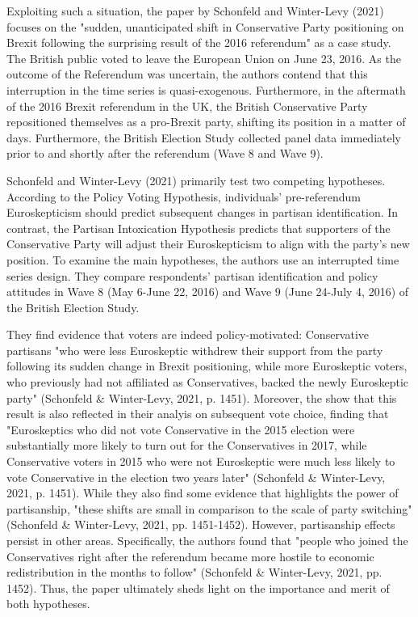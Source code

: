 \documentclass[12pt,letterpaper]{article}
\begin{document}
	Exploiting such a situation, the paper by Schonfeld and Winter-Levy (2021) focuses on the "sudden, unanticipated shift in Conservative Party positioning on Brexit following the surprising result of the 2016 referendum" as a case study. The British public voted to leave the European Union on June 23, 2016. As the outcome of the Referendum was uncertain, the authors contend that this interruption in the time series is quasi-exogenous. Furthermore, in the aftermath of the 2016 Brexit referendum in the UK, the British Conservative Party repositioned themselves as a pro-Brexit party, shifting its position in a matter of days. Furthermore, the British Election Study collected panel data immediately prior to and shortly after the referendum (Wave 8 and Wave 9).  
	
	Schonfeld and Winter-Levy (2021) primarily test two competing hypotheses. According to the Policy Voting Hypothesis, individuals’ pre-referendum Euroskepticism should predict subsequent changes in partisan identification. In contrast, the Partisan Intoxication Hypothesis predicts that supporters of the Conservative Party will adjust their Euroskepticism to align with the party’s new position. To examine the main hypotheses, the authors use an interrupted time series design. They compare respondents’ partisan identification and policy attitudes in Wave 8 (May 6-June 22, 2016) and Wave 9 (June 24-July 4, 2016) of the British Election Study.
	
	They find evidence that voters are indeed policy-motivated: Conservative partisans  "who were less Euroskeptic withdrew their support from the party following its sudden change in Brexit positioning, while more Euroskeptic voters, who previously had not affiliated as Conservatives, backed the newly Euroskeptic party" (Schonfeld \& Winter-Levy, 2021, p. 1451). Moreover, the show that this result is also reflected in their analyis on subsequent vote choice, finding that "Euroskeptics who did not vote Conservative in the 2015 election were substantially more likely to turn out for the Conservatives in 2017, while Conservative voters in 2015 who were not Euroskeptic were much less likely to vote Conservative in the election two years later" (Schonfeld \& Winter-Levy, 2021, p. 1451). While they also find some evidence that
	highlights the power of partisanship, "these shifts are small in comparison to the scale of party switching" (Schonfeld \& Winter-Levy, 2021, pp. 1451-1452). However, partisanship effects persist in other areas. Specifically, the authors found that "people who joined the Conservatives right after the referendum became more hostile to economic redistribution in the months to follow" (Schonfeld \& Winter-Levy, 2021, pp. 1452). Thus, the paper ultimately sheds light on the importance and merit of both hypotheses. 
	
\end{document}
